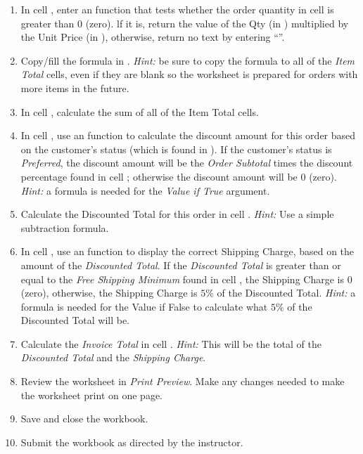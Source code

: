 \begin{enumbox}
\begin{enumerate}
		\item In cell , enter an  function that tests whether the order quantity in cell  is greater than $ 0 $ (zero). lf it is, return the value of the Qty (in ) multiplied by the Unit Price (in ), otherwise, return no text by entering ``''.
		\item Copy/fill the formula in  . \textit{Hint:} be sure to copy the formula to all of the \textit{Item Total} cells, even if they are blank so the worksheet is prepared for orders with more items in the future.
		\item In cell , calculate the sum of all of the Item Total cells.
		\item In cell , use an  function to calculate the discount amount for this order based on the customer's status (which is found in ). If the customer's status is \textit{Preferred}, the discount amount will be the \textit{Order Subtotal} times the discount percentage found in cell ; otherwise the discount amount will be $ 0 $ (zero). \textit{Hint:} a formula is needed for the \textit{Value if True} argument.
		\item Calculate the Discounted Total for this order in cell . \textit{Hint:} Use a simple subtraction formula.
		\item In cell , use an  function to display the correct Shipping Charge, based on the amount of the \textit{Discounted Total}. If the \textit{Discounted Total} is greater than or equal to the \textit{Free Shipping Minimum} found in cell , the Shipping Charge is $ 0 $ (zero), otherwise, the Shipping Charge is $ 5\% $ of the Discounted Total. \textit{Hint:} a formula is needed for the Value if False to calculate what $ 5\% $ of the Discounted Total will be.
		\item Calculate the \textit{Invoice Total} in cell . \textit{Hint:} This will be the total of the \textit{Discounted Total} and the \textit{Shipping Charge}.
		\item Review the worksheet in \textit{Print Preview}. Make any changes needed to make the worksheet print on one page.
		\item Save and close the  workbook.
		\item Submit the  workbook as directed by the instructor.
	\end{enumerate}
\end{enumbox}
